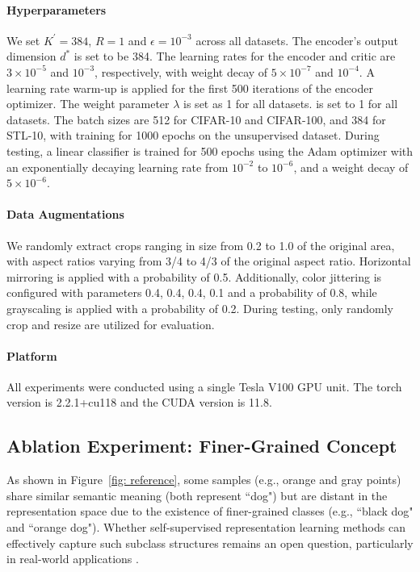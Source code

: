 \paragraph{Hyperparameters}
We set $K^\prime = 384$, $R=1$ and $\epsilon = 10^{-3}$ across all datasets. The encoder's output dimension $d^*$ is set to be 384.  The learning rates for the encoder and critic are $3 \times 10^{-5}$ and $10^{-3}$, respectively, with weight decay of $5 \times 10^{-7}$ and $10^{-4}$. A learning rate warm-up is applied for the first 500 iterations of the encoder optimizer. The weight parameter $\lambda$ is set as 1 for all datasets. is set to 1 for all datasets. The batch sizes are 512 for CIFAR-10 and CIFAR-100, and 384 for STL-10, with training for 1000 epochs on the unsupervised dataset. During testing, a linear classifier is trained for 500 epochs using the Adam optimizer with an exponentially decaying learning rate from $10^{-2}$ to $10^{-6}$, and a weight decay of $5 \times 10^{-6}$.

\paragraph{Data Augmentations}
We randomly extract crops ranging in size from 0.2 to 1.0 of the original area, with aspect ratios varying from 3/4 to 4/3 of the original aspect ratio. Horizontal mirroring is applied with a probability of 0.5. Additionally, color jittering is configured with parameters 0.4, 0.4, 0.4, 0.1 and a probability of 0.8, while grayscaling is applied with a probability of 0.2. During testing, only randomly crop and resize are utilized for evaluation.

\paragraph{Platform}
All experiments were conducted using a single Tesla V100 GPU unit. The torch version is 2.2.1+cu118 and the CUDA version is 11.8.

\subsection{Ablation Experiment: Finer-Grained Concept} \label{subsection: finer-grained concept}
As shown in Figure~\ref{fig: reference}, some samples (e.g., orange and gray points) share similar semantic meaning (both represent ``dog") but are distant in the representation space due to the existence of finer-grained classes (e.g., ``black dog" and ``orange dog"). Whether self-supervised representation learning methods can effectively capture such subclass structures remains an open question, particularly in real-world applications \citep{haochen2021spectral, haochen2022beyond, haochen2023theoretical}.

